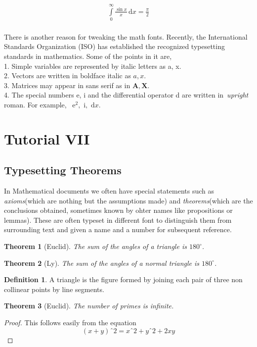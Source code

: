 \documentclass{article}
\newtheorem{thm}{Theorem}[section]
\theoremstyle{definition}
\newtheorem{dfn}{Definition}
\theoremstyle{remark}
\theoremstyle{plain}
\numberwithin{equation}{subsection}
\begin{document}
{\begin{align*}
\int\limits_0^\infty\frac{\sin x}{x}\,\mathrm{d}x=\frac{\pi}{2}
\end{align*}\\
There is another reason for tweaking the math fonts. Recently, the International
Standards Organization (ISO) has established the recognized typesetting standards in
mathematics. Some of the points in it are,\\
1. Simple variables are represented by italic letters as a, x.\\
2. Vectors are written in boldface italic as $a, x$.\\
3. Matrices may appear in sans serif as in $\mathbf{A,X}$.\\
4. The special numbers e, i and the differential operator d are written in\ \textit{upright } roman. For example, \
\newcommand{\me}{\mathrm{e}}$\me^2,$
\newcommand{\mi}{\mathrm{i}}$\mi,$
\newcommand{\diff}{\mathrm{d}}$\diff x$.

\newpage
\section{Tutorial VII}
\subsection{Typesetting Theorems}
In Mathematical documents we often have special statements such as \textit{axioms}(which are nothing but the assumptions made) and \textit{theorems}(which are the conclusions obtained, sometimes known by ohter names like propositions or lemmas). These are often typeset in different font to distinguish them from surrounding text and given a name and a number for subsequent reference.
\begin{thm}[Euclid]
	The sum of the angles of a triangle is $180^\circ$.
\end{thm}
\begin{thm}[Ly]
	The sum of the angles of a normal triangle is $180^\circ$.
\end{thm}
\begin{dfn}
	A triangle is the figure formed by joining each pair
	of three non collinear points by line segments.
\end{dfn}
\begin{thm}[Euclid]
	The number of primes is infinite.
\end{thm}
\begin{proof}
	This follows easily from the equation
	\begin{equation}
	(x+y)ˆ2=xˆ2+yˆ2+2xy\tag*{\qed}
	\end{equation}
	\renewcommand{\qed}{}
\end{proof}

}
\end{document}
